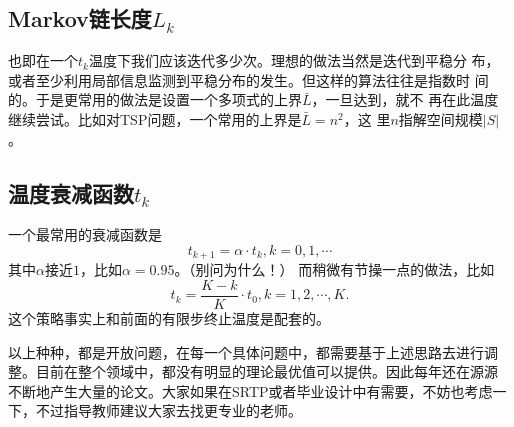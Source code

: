 \subsection{Markov链长度$L_k$}
也即在一个$t_k$温度下我们应该迭代多少次。理想的做法当然是迭代到平稳分
布，或者至少利用局部信息监测到平稳分布的发生。但这样的算法往往是指数时
间的。于是更常用的做法是设置一个多项式的上界$\bar{L}$，一旦达到，就不
再在此温度继续尝试。比如对TSP问题，一个常用的上界是$\bar{L} = n^2$，这
里$n$指解空间规模$|S|$。

\subsection{温度衰减函数$t_k$}
一个最常用的衰减函数是
\begin{equation}
  t_{k + 1} = \alpha \cdot t_k, k = 0, 1, \cdots
\end{equation}
其中$\alpha$接近$1$，比如$\alpha = 0.95$。（别问为什么！）
而稍微有节操一点的做法，比如
\begin{equation}
  t_k = \frac{K - k}{K} \cdot t_0, k = 1, 2, \cdots, K.
\end{equation}
这个策略事实上和前面的有限步终止温度是配套的。

以上种种，都是开放问题，在每一个具体问题中，都需要基于上述思路去进行调
整。目前在整个领域中，都没有明显的理论最优值可以提供。因此每年还在源源
不断地产生大量的论文。大家如果在SRTP或者毕业设计中有需要，不妨也考虑一
下，不过指导教师建议大家去找更专业的老师。